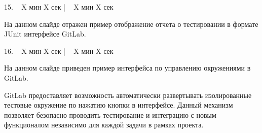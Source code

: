 \documentclass[a4paper,14pt]{extarticle}
\begin{document}
    15. ~ X мин X сек | ~ X мин X сек

    На данном слайде отражен пример отображение отчета о тестировании в формате JUnit интерфейсе GitLab.

    16. ~ X мин X сек | ~ X мин X сек

    На данном слайде приведен пример интерфейса по управлению окружениями в GitLab.

    GitLab предоставляет возможность автоматически развертывать изолированные тестовые окружение по нажатию кнопки
    в интерфейсе. Данный механизм позволяет безопасно проводить тестирование и интеграцию с новым функционалом
    независимо для каждой задачи в рамках проекта.

%
%
%
\end{document}
